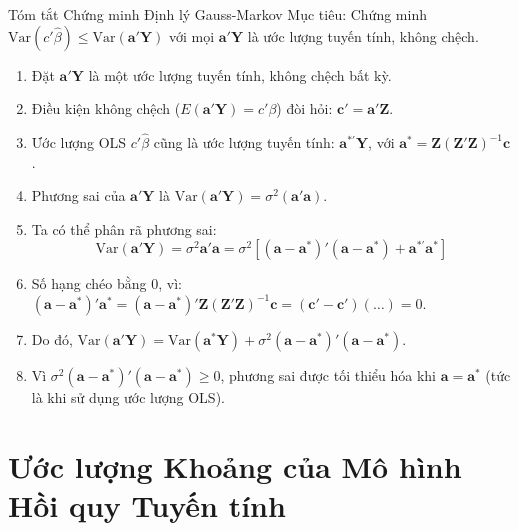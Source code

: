 \begin{frame}{Tóm tắt Chứng minh Định lý Gauss-Markov}
    Mục tiêu: Chứng minh $\text{Var}(c'\hat{\beta}) \le \text{Var}(\mathbf{a}'\mathbf{Y})$ với mọi $\mathbf{a}'\mathbf{Y}$ là ước lượng tuyến tính, không chệch.
    \begin{enumerate}
        \item Đặt $\mathbf{a}'\mathbf{Y}$ là một ước lượng tuyến tính, không chệch bất kỳ.
        \item Điều kiện không chệch ($E(\mathbf{a}'\mathbf{Y}) = c'\beta$) đòi hỏi: $\mathbf{c}' = \mathbf{a}'\mathbf{Z}$.
        \item Ước lượng OLS $c'\hat{\beta}$ cũng là ước lượng tuyến tính: $\mathbf{a}^{*\prime}\mathbf{Y}$, với $\mathbf{a}^* = \mathbf{Z}(\mathbf{Z}'\mathbf{Z})^{-1}\mathbf{c}$.
        \item Phương sai của $\mathbf{a}'\mathbf{Y}$ là $\text{Var}(\mathbf{a}'\mathbf{Y}) = \sigma^2(\mathbf{a}'\mathbf{a})$.
        \item Ta có thể phân rã phương sai:
        \[
        \text{Var}(\mathbf{a}'\mathbf{Y}) = \sigma^2 \mathbf{a}'\mathbf{a} = \sigma^2 [ (\mathbf{a}-\mathbf{a}^*)'(\mathbf{a}-\mathbf{a}^*) + \mathbf{a}^{*\prime}\mathbf{a}^* ]
        \]
        
        \item Số hạng chéo bằng 0, vì:
        $(\mathbf{a}-\mathbf{a}^*)'\mathbf{a}^* = (\mathbf{a}-\mathbf{a}^*)'\mathbf{Z}(\mathbf{Z}'\mathbf{Z})^{-1}\mathbf{c} = (\mathbf{c}' - \mathbf{c}')(\dots) = 0$.
        \item Do đó, $\text{Var}(\mathbf{a}'\mathbf{Y}) = \text{Var}(\mathbf{a}^*\mathbf{Y}) + \sigma^2(\mathbf{a}-\mathbf{a}^*)'(\mathbf{a}-\mathbf{a}^*)$.
        \item Vì $\sigma^2(\mathbf{a}-\mathbf{a}^*)'(\mathbf{a}-\mathbf{a}^*) \ge 0$, phương sai được tối thiểu hóa khi $\mathbf{a} = \mathbf{a}^*$ (tức là khi sử dụng ước lượng OLS).
    \end{enumerate}
\end{frame}

\section{Ước lượng Khoảng của Mô hình Hồi quy Tuyến tính}

